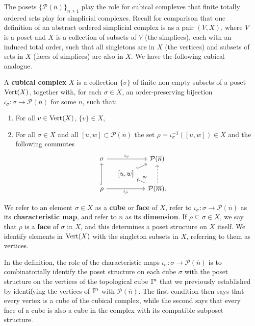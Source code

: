 The posets $\{\mathcal P(\overline n)\}_{n \geq 1}$ play the role for cubical complexes that finite totally ordered sets play for simplicial complexes.
Recall for comparison that one definition of an abstract ordered simplicial complex is as a pair $(V, X)$, where $V$ is a poset and $X$ is a collection of subsets of $V$ (the simplices), each with an induced total order, such that all singletons are in $X$ (the vertices) and subsets of sets in $X$ (faces of simplices) are also in $X$.
We have the following cubical analogue.

\begin{definition}\label{D:cubical}
	A \textbf{cubical complex} $X$ is a collection $\{ \sigma \}$ of finite non-empty subsets of a poset
	${\rm Vert}(X)$, together with, for each $\sigma \in X$, an order-preserving bijection $\iota_\sigma \colon \sigma \to \mathcal P(\overline n)$ for some $n$, such that:
	\begin{enumerate}
		\item For all $v \in {\rm Vert}(X)$, $\{v\} \in X$,
		\item For all $\sigma \in X$ and all $[u,w] \subset \mathcal P(\overline n)$ the set $\rho = \iota_\sigma^{-1}([u,w]) \in X$ and the following commutes
		\begin{equation*}
			\begin{tikzcd} [row sep = tiny, column sep = small]
				\sigma \arrow[rr, "\iota_\sigma"] && \mathcal P(\overline n) \\
				& [-5pt] {[}u,w{]} \arrow[ur, hook] & \\
				\rho \arrow[uu, hook] \arrow[rr, "\iota_\rho"'] && \mathcal P(\overline m).
				\arrow[ul, "\cong"'] \arrow[uu, dashed]
			\end{tikzcd}
		\end{equation*}
	\end{enumerate}
	We refer to an element $\sigma \in X$ as a \textbf{cube} or \textbf{face} of $X$, refer to $\iota_\sigma \colon \sigma \to \mathcal P(\overline{n})$ as its \textbf{characteristic map},
	and refer to $n$ as its \textbf{dimension}.
	If $\rho \subseteq \sigma \in X$, we say that $\rho$ is a \textbf{face} of $\sigma$ in $X$, and this determines a poset structure on $X$ itself.
	We identify elements in ${\rm Vert}(X)$ with the singleton subsets in $X$, referring to them as vertices.
\end{definition}

In the definition, the role of the characteristic maps $\iota_\sigma \colon \sigma \to \mathcal P(\overline{n})$ is to combinatorially identify the poset structure on each cube $\sigma$ with the poset structure on the vertices of the topological cube $\mathbb{I}^n$ that we previously established by identifying the vertices of $\mathbb{I}^n$ with $\mathcal P(\overline n)$.
The first condition then says that every vertex is a cube of the cubical complex, while the second says that every face of a cube is also a cube in the complex with its compatible subposet structure.




